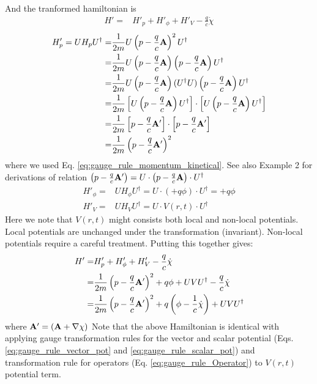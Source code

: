 \documentclass[11pt]{article}
\begin{document}
And the tranformed hamiltonian is
\begin{align*}
H' =&  H'_p + H'_\phi + H'_V  - \frac{q}{c} \dot \chi 
\end{align*}
\begin{align*}
 H'_p =  U H_pU^\dag =& \frac{1}{2m}  U \left(p -\frac{q}{c} \vb A\right)^2 U^\dag\\ 
=&  \frac{1}{2m}U \left(p -\frac{q}{c} \vb A\right) \left(p -\frac{q}{c} \vb A\right)U^\dag \\
=&  \frac{1}{2m}U \left(p -\frac{q}{c} \vb A\right)(U^\dag U )\left(p -\frac{q}{c} \vb A\right)U^\dag \\
=&  \frac{1}{2m} \left[ U \left(p -\frac{q}{c} \vb A\right)U^\dag \right]\cdot \left[ U \left(p -\frac{q}{c} \vb A\right)U^\dag \right] \\
=&  \frac{1}{2m} \left[ p -\frac{q}{c} \vb A'  \right]\cdot \left[ p -\frac{q}{c} \vb A'  \right]  \\
=&  \frac{1}{2m} \left( p -\frac{q}{c} \vb A'  \right)^2
\end{align*}
where we used Eq. \ref{eq:gauge_rule_momentum_kinetical}. See also Example 2 for  derivations of relation $\left(p-\frac{q}{c}\vb A'\right) =U\cdot \left(p-\frac{q}{c}\vb A\right)\cdot U^\dag$
\begin{align*}
    H'_\phi =&  U H_\phi U^\dag =  U \cdot(+q\phi ) \cdot U^\dag =  +q\phi  \\
    H'_V  =&  U H_V U^\dag =   U \cdot V(r,t)  \cdot  U^\dag 
\end{align*}
Here we note that $V(r,t)$   might consists both local and non-local potentials.  Local potentials are unchanged under the transformation (invariant). Non-local potentials require a careful treatment.
Putting this together gives:
\begin{align*}
    H' =& H'_p +H'_\phi + H'_V -\frac{q}{c} \dot \chi \\
       =& \frac{1}{2m} \left(p-\frac{q}{c}\vb A' \right)^2  + q\phi +UVU^\dag -\frac{q}{c} \dot \chi \\ 
       =&  \frac{1}{2m} \left(p-\frac{q}{c}\vb A' \right)^2  + q\left( \phi  - \frac{1}{c} \dot \chi \right)   +  UVU^\dag  %
\end{align*}
where $\vb A' = (\vb A+ \nabla \chi)$
Note that the above Hamiltonian is  identical with applying gauge transformation rules for  the  vector and scalar potential  (Eqs.  \ref{eq:gauge_rule_vector_pot} and  \ref{eq:gauge_rule_scalar_pot})  and  transformation rule for operators (Eq. \ref{eq:gauge_rule_Operator}) to $V(r,t)$  potential term.  
\end{document}
